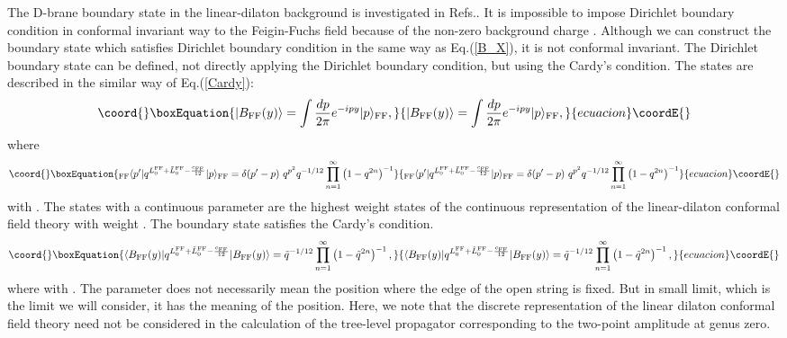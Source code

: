 \documentclass[a4paper,prd,preprint]{revtex4}
\begin{document}
The D-brane boundary state in the linear-dilaton background
 is investigated in Refs.\cite{Li,Rajaraman-Rozali}.
It is impossible to impose Dirichlet boundary condition
 in conformal invariant way to the Feigin-Fuchs field
 because of the non-zero background charge \coordHE{}\cite{Li}.
Although we can construct the boundary state
 which satisfies Dirichlet boundary condition
 in the same way as Eq.(\ref{B_X}),
 it is not conformal invariant.
The Dirichlet boundary state can be defined,
 not directly applying the Dirichlet boundary condition,
 but using the Cardy's condition\cite{Rajaraman-Rozali}.
The states are described in the similar way of Eq.(\ref{Cardy}):
\begin{equation}\coord{}\boxEquation{
 | B_{\rm FF}(y) \rangle
 = \int {{dp} \over {2\pi}} e^{-i p y} | p \rangle_{\rm FF},
\label{B_FF}
}{
 | B_{\rm FF}(y) \rangle
 = \int {{dp} \over {2\pi}} e^{-i p y} | p \rangle_{\rm FF},
}{ecuacion}\coordE{}\end{equation}
 where
\begin{equation}\coord{}\boxEquation{
 {}_{\rm FF}\langle p' |
  q^{L_0^{\rm FF} + {\tilde L}_0^{\rm FF} - {c_{\rm FF} \over {12}}}
 | p \rangle_{\rm FF}
 = \delta (p'-p) \ q^{p^2} q^{-1/12}
   \prod_{n=1}^\infty \left( 1 - q^{2n} \right)^{-1}
}{
 {}_{\rm FF}\langle p' |
  q^{L_0^{\rm FF} + {\tilde L}_0^{\rm FF} - {c_{\rm FF} \over {12}}}
 | p \rangle_{\rm FF}
 = \delta (p'-p) \ q^{p^2} q^{-1/12}
   \prod_{n=1}^\infty \left( 1 - q^{2n} \right)^{-1}
}{ecuacion}\coordE{}\end{equation}
 with \coordHE{}.
The states \coordHE{}
 with a continuous parameter \coordHE{}
 are the highest weight states of the continuous representation
 of the linear-dilaton conformal field theory
 with weight
 \coordHE{}.
The boundary state \coordHE{} satisfies
 the Cardy's condition.
\begin{equation}\coord{}\boxEquation{
 \langle B_{\rm FF}(y) |
  q^{L_0^{\rm FF} + {\tilde L}_0^{\rm FF} - {c_{\rm FF} \over {12}}}
 | B_{\rm FF}(y) \rangle
 = {\tilde q}^{-1/12}
   \prod_{n=1}^\infty \left( 1 - {\tilde q}^{2n} \right)^{-1},
}{
 \langle B_{\rm FF}(y) |
  q^{L_0^{\rm FF} + {\tilde L}_0^{\rm FF} - {c_{\rm FF} \over {12}}}
 | B_{\rm FF}(y) \rangle
 = {\tilde q}^{-1/12}
   \prod_{n=1}^\infty \left( 1 - {\tilde q}^{2n} \right)^{-1},
}{ecuacion}\coordE{}\end{equation}
 where \coordHE{}
 with \coordHE{}.
The parameter \coordHE{} does not necessarily mean the position
 where the edge of the open string is fixed.
But in small \coordHE{} limit,
 which is the limit we will consider,
 it has the meaning of the position.
Here, we note that the discrete representation of
 the linear dilaton conformal field theory need not be considered
 in the calculation of the tree-level propagator
 corresponding to the two-point amplitude at genus zero\cite{AFK}.
\end{document}
